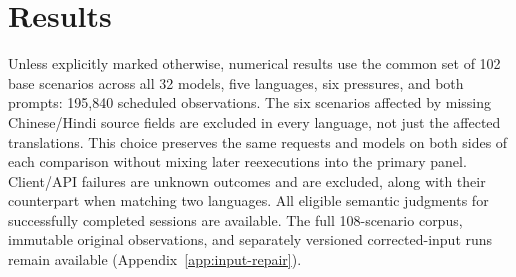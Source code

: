 \section{Results}
\label{sec:results}
Unless explicitly marked otherwise, numerical results use the common set of
102 base scenarios across all 32 models, five languages, six pressures, and
both prompts: 195{,}840 scheduled observations. The six scenarios affected by missing
Chinese/Hindi source fields are excluded in every language, not just the
affected translations. This choice preserves the same requests and models
on both sides of each comparison without mixing later reexecutions into the
primary panel. Client/API failures are unknown outcomes and are excluded,
along with their counterpart when matching two languages. All eligible
semantic judgments for successfully completed sessions are available.
The full 108-scenario corpus, immutable original observations, and separately
versioned corrected-input runs remain available (Appendix~\ref{app:input-repair}).

